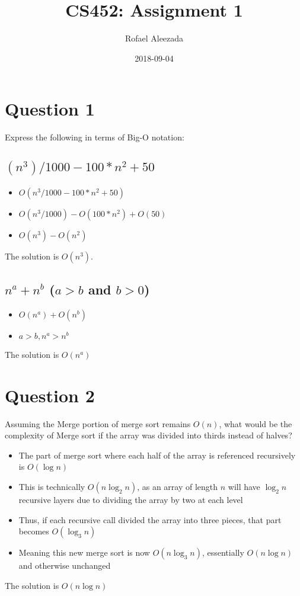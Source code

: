 \documentclass{report}
\title{CS452: Assignment 1}
\date{2018-09-04}
\author{Rofael Aleezada}
\begin{document}
    \maketitle

    \section{Question 1}
    Express the following in terms of Big-O notation:
        \subsection{$(n^3)/1000 - 100 * n^2 + 50$}
        	\begin{itemize}
        		\item{$O(n^3 / 1000 - 100 * n^2 + 50)$}
        		\item{$O(n^3 / 1000) - O(100*n^2) + O(50)$}
        		\item{$O(n^3) - O(n^2)$}
        	\end{itemize}
            The solution is $O(n^3)$.

        \subsection{$n^a + n^b$ ($a > b$ and $b > 0$)}
        	\begin{itemize}
        		\item{$O(n^a) + O(n^b)$}
        		\item{$a > b, n^a > n^b$}
        	\end{itemize}
            The solution is $O(n^a)$

    \section{Question 2}
    Assuming the Merge portion of merge sort remains $O(n)$, what would be the complexity of Merge sort if the array was divided into thirds instead of halves?
        \begin{itemize}
            \item{The part of merge sort where each half of the array is referenced recursively is $O(\log n)$}
            \item{This is technically $O(n\log_2 n)$, as an array of length $n$ will have $\log_2 n$ recursive layers due to dividing the array by two at each level}
            \item{Thus, if each recursive call divided the array into three pieces, that part becomes $O(\log_3 n)$}
            \item{Meaning this new merge sort is now $O(n\log_3 n)$, essentially $O(n\log n)$ and otherwise unchanged}
        \end{itemize}
        The solution is $O(n\log n)$
\end{document}
